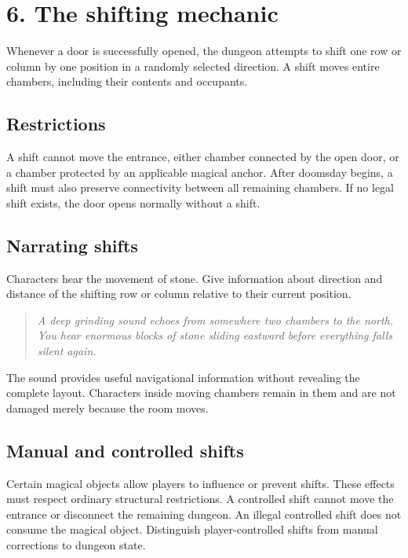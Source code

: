 \section{6. The shifting mechanic}

Whenever a door is successfully opened, the dungeon attempts to shift one row or column by one position in a randomly selected direction. A shift moves entire chambers, including their contents and occupants.

\begin{center}\end{center}

\subsection{Restrictions}

A shift cannot move the entrance, either chamber connected by the open door, or a chamber protected by an applicable magical anchor. After doomsday begins, a shift must also preserve connectivity between all remaining chambers. If no legal shift exists, the door opens normally without a shift.

\subsection{Narrating shifts}

Characters hear the movement of stone. Give information about direction and distance of the shifting row or column relative to their current position.

\begin{quote}\itshape A deep grinding sound echoes from somewhere two chambers to the north. You hear enormous blocks of stone sliding eastward before everything falls silent again.\end{quote}

The sound provides useful navigational information without revealing the complete layout. Characters inside moving chambers remain in them and are not damaged merely because the room moves.

\subsection{Manual and controlled shifts}

Certain magical objects allow players to influence or prevent shifts. These effects must respect ordinary structural restrictions. A controlled shift cannot move the entrance or disconnect the remaining dungeon. An illegal controlled shift does not consume the magical object. Distinguish player-controlled shifts from manual corrections to dungeon state.
